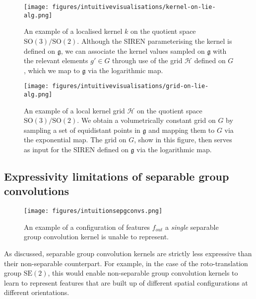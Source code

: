 \documentclass[nohyperref]{article}
\theoremstyle{plain}
\theoremstyle{definition}
\theoremstyle{remark}
\begin{document}
\begin{figure}
\begin{minipage}{.5\textwidth}
\centering
\texttt{[image: figures/intuitivevisualisations/kernel-on-lie-alg.png]}
\captionsetup{width=.7\linewidth}
\caption[A kernel on the Lie algebra]{An example of a localised kernel $k$ on the quotient space $\mathrm{SO(3)/SO(2)}$. Although the SIREN parameterising the kernel is defined on $\mathfrak{g}$, we can associate the kernel values sampled on $\mathfrak{g}$ with the relevant elements $g' \in G$ through use of the grid $\mathcal{H}$ defined on $G$, which we map to $\mathfrak{g}$ via the logarithmic map.}
\label{fig:kernelongroup}
\end{minipage}
\begin{minipage}{.5\textwidth}
\centering
\captionsetup{width=.9\linewidth}
\texttt{[image: figures/intuitivevisualisations/grid-on-lie-alg.png]}
\caption[A grid on the Lie algebra]{An example of a local kernel grid $\mathcal{H}$ on the quotient space $\mathrm{SO(3)/SO(2)}$. We obtain a volumetrically constant grid on $G$ by sampling a set of equidistant points in $\mathfrak{g}$ and mapping them to $G$ via the exponential map. The grid on $G$, show in this figure, then serves as input for the SIREN defined on $\mathfrak{g}$ via the logarithmic map.}
\label{fig:gridongroup}
\end{minipage}
\end{figure}
\subsection{Expressivity limitations of separable group convolutions}\label{app:featurescannotrecognise}
\begin{figure}[t]
\centering
\texttt{[image: figures/intuitionsepgconvs.png]}
\caption[What features separable group convolutions cannot recognise]{An example of a configuration of features $f_{out}$ a \textit{single} separable group convolution kernel is unable to represent.}
\label{fig:intuitionlimitations}
\end{figure}
As discussed, separable group convolution kernels are strictly less expressive than their non-separable counterpart. For example, in the case of the roto-translation group $\mathrm{SE(2)}$, this would enable non-separable group convolution kernels to learn to represent features that are built up of different spatial configurations at different orientations.
\end{document}
